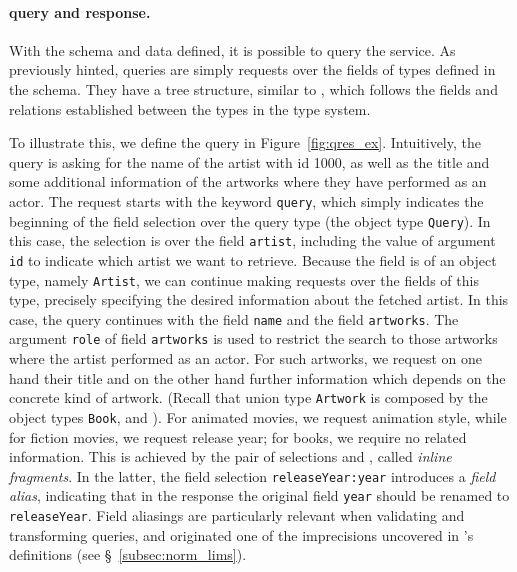 

\paragraph{\gql query and response.}

With the schema and data defined, it is possible to query the service. 
As previously hinted, \gql queries are simply requests over the fields of types defined in the schema.
They have a tree structure, similar to \json, which follows the fields and relations established between the types
in the type system.

To illustrate this, we define the query in
Figure~\ref{fig:qres_ex}. Intuitively, the query is asking for the
name of the artist with id 1000, as well as the title and some
additional information of the artworks where they have performed as an
actor.  The request starts with the keyword \texttt{query}, which
simply indicates the beginning of the field selection over the query
type (the object type \texttt{Query}).   In this case, the selection is over the field
\texttt{artist}, including the value of argument \texttt{id} to
indicate which artist we want to retrieve.  Because the field is of an
object type, namely \texttt{Artist}, we can continue making requests
over the fields of this type, precisely specifying the desired
information about the fetched artist. In this case, the query
continues with the field \texttt{name} and the field
\texttt{artworks}. The argument \texttt{role} of field
\texttt{artworks} is used to restrict the search to those artworks
where the artist performed as an actor.  For such artworks, we request
on one hand their title and on the other hand further information
which depends on the concrete kind of artwork. (Recall that union type
\texttt{Artwork} is composed by the object types \texttt{Book},
\fiction and \animation). For animated movies, we request animation
style, while for fiction movies, we request release year; for books,
we require no related information. This is achieved by the pair of
selections  and , called {\em inline fragments}. In the
latter, the field selection \texttt{releaseYear:year} introduces a
{\em field alias}, indicating that in the response the original field
\texttt{year} should be renamed to \texttt{releaseYear}. Field
aliasings are particularly relevant when validating and transforming
queries, and originated one of the imprecisions uncovered in \HP's
definitions (see \S~\ref{subsec:norm_lims}).


